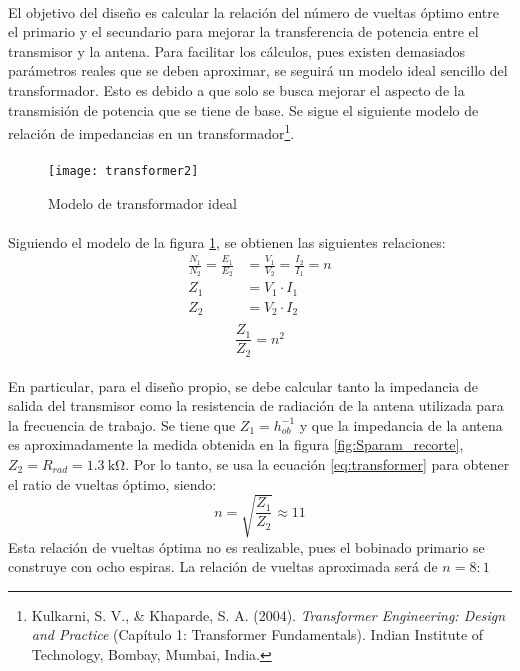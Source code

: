 \paragraph{}
El objetivo del diseño es calcular la relación del número de vueltas óptimo entre el primario y el secundario para mejorar la transferencia de potencia entre el transmisor y la antena. 
Para facilitar los cálculos, pues existen demasiados parámetros reales que se deben aproximar, se seguirá un modelo ideal sencillo del transformador. Esto es debido a que solo se busca mejorar el aspecto de la transmisión de potencia que se tiene de base.
Se sigue el siguiente modelo de relación de impedancias en un transformador\footnote{Kulkarni, S. V., \& Khaparde, S. A. (2004). \textit{Transformer Engineering: Design and Practice} (Capítulo 1: Transformer Fundamentals). Indian Institute of Technology, Bombay, Mumbai, India.}.

\paragraph{}
\begin{figure}[h!]
    \centering
    \texttt{[image: transformer2]}
    \caption{Modelo de transformador ideal}
    \label{fig:transformer}
\end{figure}
\paragraph{}
Siguiendo el modelo de la figura \ref{fig:transformer}, se obtienen las siguientes relaciones:
\begin{align*}
   \frac{N_1}{N_2} = \frac{E_1}{E_2} &= \frac{V_1}{V_2} = \frac{I_2}{I_1} = n \\
   Z_1 &= V_1 \cdot I_1 \\
   Z_2 &= V_2 \cdot I_2 \\
\end{align*}
\begin{equation}
   \label{eq:transformer}
   \frac{Z_1}{Z_2} = n^2 
\end{equation}
\paragraph{}
En particular, para el diseño propio, se debe calcular tanto la impedancia de salida del transmisor como la resistencia de radiación de la antena utilizada para la frecuencia de trabajo.
Se tiene que $Z_1 = h_{ob}^{-1}$ y que la impedancia de la antena es aproximadamente la medida obtenida en la figura \ref{fig:Sparam_recorte}, $Z_2 = R_{rad} = \SI{1.3}{\kilo\ohm}$.
Por lo tanto, se usa la ecuaci\'on \ref{eq:transformer} para obtener el ratio de vueltas óptimo, siendo: $$ n = \sqrt{\frac{Z_1}{Z_2}} \approx 11 $$
Esta relación de vueltas óptima no es realizable, pues el bobinado primario se construye con ocho espiras. La relación de vueltas aproximada será de $ n = 8:1 $

